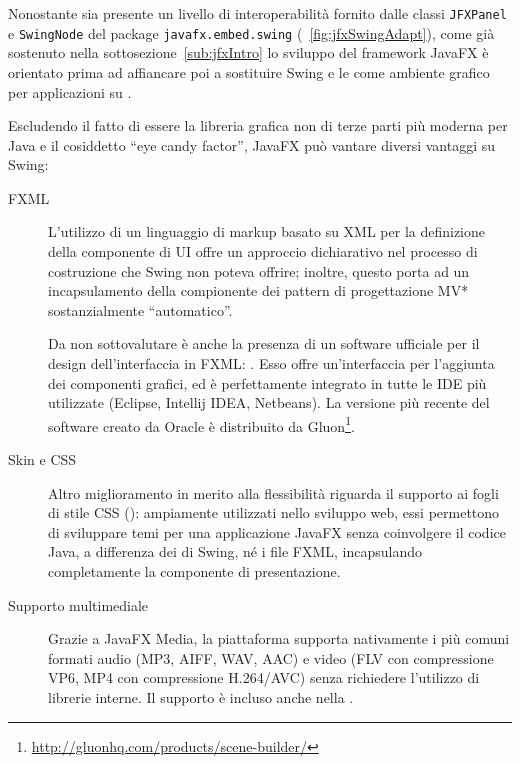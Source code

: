             Nonostante sia presente un livello di interoperabilità fornito dalle classi  \texttt{JFXPanel} e \texttt{SwingNode} del package \texttt{javafx\dothyp embed\dothyp swing} (\figurename~\ref{fig:jfxSwingAdapt}), come già sostenuto nella sottosezione~\ref{sub:jfxIntro} lo sviluppo del framework JavaFX è orientato prima ad affiancare poi a sostituire Swing e le  come ambiente grafico per applicazioni su .

            Escludendo il fatto di essere la libreria grafica non di terze parti più moderna per Java e il cosiddetto ``eye candy factor'', JavaFX può vantare diversi vantaggi su Swing:

            \begin{description}
              \item [FXML] L'utilizzo di un linguaggio di markup basato su XML per la definizione della componente di UI offre un approccio dichiarativo nel processo di costruzione che Swing non poteva offrire; inoltre, questo porta ad un incapsulamento della compionente  dei pattern di progettazione MV* sostanzialmente ``automatico''.

              Da non sottovalutare è anche la presenza di un software ufficiale per il design dell'interfaccia in FXML: . Esso offre un'interfaccia  per l'aggiunta dei componenti grafici, ed è perfettamente integrato in tutte le IDE più utilizzate (Eclipse, Intellij IDEA, Netbeans).
              La versione più recente del software creato da Oracle è distribuito da Gluon\footnote{\url{http://gluonhq.com/products/scene-builder/}}.

              \item[Skin e CSS] Altro miglioramento in merito alla flessibilità riguarda il supporto ai fogli di stile CSS (): ampiamente utilizzati nello sviluppo web, essi permettono di sviluppare temi per una applicazione JavaFX senza coinvolgere il codice Java, a differenza dei  di Swing, né i file FXML, incapsulando completamente la componente di presentazione.

              \item[Supporto multimediale] Grazie a JavaFX Media, la piattaforma supporta nativamente i più comuni formati audio (MP3, AIFF, WAV, AAC) e video (FLV con compressione VP6, MP4 con compressione H.264/AVC) senza richiedere l'utilizzo di librerie interne. Il supporto è incluso anche nella .


\end{description}
